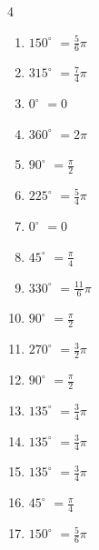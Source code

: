 \begin{multicols}{4}
\begin{enumerate}
  \item $\displaystyle 150^{\circ}$
        $\displaystyle =\frac{5}{6}\pi$

  \item $\displaystyle 315^{\circ}$
        $\displaystyle =\frac{7}{4}\pi$

  \item $\displaystyle 0^{\circ}$
        $\displaystyle =0$

  \item $\displaystyle 360^{\circ}$
        $\displaystyle =2\pi$

  \item $\displaystyle 90^{\circ}$
        $\displaystyle =\frac{\pi}{2}$

  \item $\displaystyle 225^{\circ}$
        $\displaystyle =\frac{5}{4}\pi$

  \item $\displaystyle 0^{\circ}$
        $\displaystyle =0$

  \item $\displaystyle 45^{\circ}$
        $\displaystyle =\frac{\pi}{4}$

  \item $\displaystyle 330^{\circ}$
        $\displaystyle =\frac{11}{6}\pi$

  \item $\displaystyle 90^{\circ}$
        $\displaystyle =\frac{\pi}{2}$

  \item $\displaystyle 270^{\circ}$
        $\displaystyle =\frac{3}{2}\pi$

  \item $\displaystyle 90^{\circ}$
        $\displaystyle =\frac{\pi}{2}$

\columnbreak %

  \item $\displaystyle 135^{\circ}$
        $\displaystyle =\frac{3}{4}\pi$

  \item $\displaystyle 135^{\circ}$
        $\displaystyle =\frac{3}{4}\pi$

  \item $\displaystyle 135^{\circ}$
        $\displaystyle =\frac{3}{4}\pi$

  \item $\displaystyle 45^{\circ}$
        $\displaystyle =\frac{\pi}{4}$

  \item $\displaystyle 150^{\circ}$
        $\displaystyle =\frac{5}{6}\pi$


\end{enumerate}
\end{multicols}
